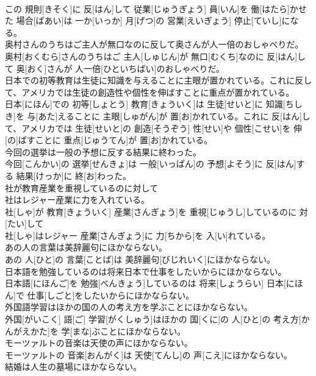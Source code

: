 \documentclass[8pt]{extreport}
\begin{document}
\begin{CJK}{UTF8}{min}
\\	この 規則[きそく]に 反[はん]して 従業[じゅうぎょう] 員[いん]を 働[はたら]かせた 場合[ばあい]は 一か[いっか] 月[げつ]の 営業[えいぎょう] 停止[ていし]になる。
\\	奥村さんのうちはご主人が無口なのに反して奥さんが人一倍のおしゃべりだ。	
\\	奥村[おくむら]さんのうちはご 主人[しゅじん]が 無口[むくち]なのに 反[はん]して 奥[おく]さんが 人一倍[ひといちばい]のおしゃべりだ。
\\	日本での初等教育は生徒に知識を与えることに主眼が置かれている。これに反して、アメリカでは生徒の創造性や個性を伸ばすことに重点が置かれている。	
\\	日本[にほん]での 初等[しょとう] 教育[きょういく]は 生徒[せいと]に 知識[ちしき]を 与[あた]えることに 主眼[しゅがん]が 置[お]かれている。これに 反[はん]して、アメリカでは 生徒[せいと]の 創造[そうぞう] 性[せい]や 個性[こせい]を 伸[の]ばすことに 重点[じゅうてん]が 置[お]かれている。
\\	今回の選挙は一般の予想に反する結果に終わった。	
\\	今回[こんかい]の 選挙[せんきょ]は 一般[いっぱん]の 予想[よそう]に 反[はん]する 結果[けっか]に 終[お]わった。
\\	社が教育産業を重視しているのに対して
\\	社はレジャー産業に力を入れている。	
\\	社[しゃ]が 教育[きょういく] 産業[さんぎょう]を 重視[じゅうし]しているのに 対[たい]して 
\\	社[しゃ]はレジャー 産業[さんぎょう]に 力[ちから]を 入[い]れている。
\\	あの人の言葉は美辞麗句にほかならない。	
\\	あの 人[ひと]の 言葉[ことば]は 美辞麗句[びじれいく]にほかならない。
\\	日本語を勉強しているのは将来日本で仕事をしたいからにほかならない。	
\\	日本語[にほんご]を 勉強[べんきょう]しているのは 将来[しょうらい] 日本[にほん]で 仕事[しごと]をしたいからにほかならない。
\\	外国語学習はほかの国の人の考え方を学ぶことにほかならない。	
\\	外国[がいこく] 語[ご] 学習[がくしゅう]はほかの 国[くに]の 人[ひと]の 考え方[かんがえかた]を 学[まな]ぶことにほかならない。
\\	モーツァルトの音楽は天使の声にほかならない。	
\\	モーツァルトの 音楽[おんがく]は 天使[てんし]の 声[こえ]にほかならない。
\\	結婚は人生の墓場にほかならない。	

\end{CJK}
\end{document}

